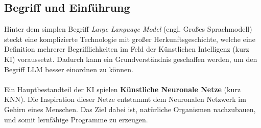 \subsection{Begriff und Einführung}
Hinter dem simplen Begriff \textit{Large Language Model} (engl. Großes Sprachmodell) steckt eine komplizierte Technologie mit großer Herkunftsgeschichte, welche eine Definition mehrerer Begrifflichkeiten im Feld der Künstlichen Intelligenz (kurz KI) voraussetzt. Dadurch kann ein Grundverständnis geschaffen werden, um den Begriff LLM besser einordnen zu können. \cite{seemannKuenstlicheIntelligenzLarge} \\\\ Ein Hauptbestandteil der KI spielen \textbf{Künstliche Neuronale Netze} (kurz \acs{KNN}). 
Die Inspiration dieser Netze entstammt dem Neuronalen Netzwerk im Gehirn eines Menschen. \cite*{seemannKuenstlicheIntelligenzLarge} Das Ziel dabei ist, natürliche Organismen nachzubauen, und somit lernfähige Programme zu erzeugen. 

